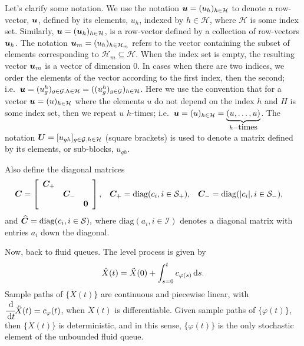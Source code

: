 {Let's clarify some notation. We use the notation \(\boldsymbol u = (u_h)_{h\in \mathcal H}\) to denote a row-vector, \(\boldsymbol u\), defined by its elements, \(u_h\), indexed by \(h\in\mathcal H\), where \(\mathcal H\) is some index set. Similarly, \(\boldsymbol u = (\boldsymbol u_h)_{h\in\mathcal H}\), is a row-vector defined by a collection of row-vectors \(\boldsymbol u_h\). The notation \(\boldsymbol u_m=(u_h)_{h\in\mathcal H_m}\) refers to the vector containing the subset of elements corresponding to \(\mathcal H_m\subseteq \mathcal H\). When the index set is empty, the resulting vector \(\boldsymbol u_m\) is a vector of dimension 0. In cases when there are two indices, we order the elements of the vector according to the first index, then the second; i.e.~\(\boldsymbol u = (u_{g}^h)_{g\in\mathcal G,h\in\mathcal H} = ((u_g^h)_{g\in\mathcal G})_{h\in\mathcal H}\). Here we use the convention that for a vector \(\boldsymbol u=(u)_{h\in \mathcal H}\) where the elements \(u\) do not depend on the index \(h\) and \(H\) is some index set, then we repeat \(u\) \(h\)-times; i.e.~\(\boldsymbol u = (u)_{h\in \mathcal H} =\underbrace{(u,\dots,u)}_{h-\mbox{times}}\). The notation \(\boldsymbol U = [u_{gh}]_{g\in\mathcal G, h\in\mathcal H}\) (square brackets) is used to denote a matrix defined by its elements, or sub-blocks, \(u_{gh}\).} 

Also define the diagonal matrices 
\begin{align*}
	\boldsymbol C &= \left[\begin{array}{ccc} \boldsymbol C_+ && \\ &\boldsymbol C_-& \\ && \boldsymbol 0\end{array}\right], && \boldsymbol C_+ = \mathrm{diag}(c_i,i\in\mathcal{S}_+), && \boldsymbol C_- = \mathrm{diag}(|c_i|,i\in\mathcal{S}_-),
\end{align*}
and 
\(
	\widehat{\boldsymbol C} = \mathrm{diag}(c_i,i\in\mathcal{S}),
\)
where \(\mathrm{diag}(a_i,i\in\mathcal I)\) denotes a diagonal matrix with entries \(a_i\) down the diagonal. 

Now, back to fluid queues. The level process is given by 
\[\ddot X(t) = \ddot X(0) + \int_{s=0}^t c_{\varphi(s)}\, \mathrm{d} s.\]
Sample paths of \(\{\ddot X (t)\}\) are continuous and piecewise linear, with \(\cfrac{\, \mathrm{d} }{\, \mathrm{d} t} \ddot X(t) = c_\varphi(t)\), when \(\ddot X(t)\) is differentiable. Given sample paths of \(\{\varphi(t)\}\), then \(\{\ddot X(t)\}\) is deterministic, and in this sense, \(\{\varphi(t)\}\) is the only stochastic element of the unbounded fluid queue. 

